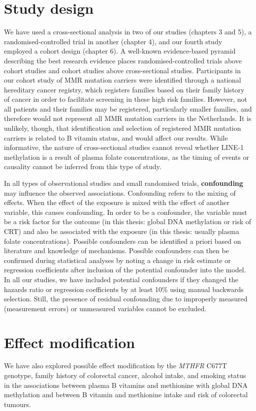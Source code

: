 \section{Study design} %
We have used a cross-sectional analysis in two of our studies (chapters 3 and 5), a randomised-controlled trial in another (chapter 4), and our fourth study employed a cohort design (chapter 6). A well-known evidence-based pyramid describing the best research evidence places randomised-controlled trials above cohort studies and cohort studies above cross-sectional studies. Participants in our cohort study of MMR mutation carriers were identified through a national hereditary cancer registry, which registers families based on their family history of cancer in order to facilitate screening in these high risk families. However, not all patients and their families may be registered, particularly smaller families, and therefore would not represent all MMR mutation carriers in the Netherlands. It is unlikely, though, that identification and selection of registered MMR mutation carriers is related to B vitamin status, and would affect our results. While informative, the nature of cross-sectional studies cannot 
reveal whether LINE-1 methylation is a result of plasma folate concentrations, as the timing of events or causality cannot be inferred from this type of study. 
 
\noindent In all types of observational studies and small randomised trials, \textbf{confounding} may influence the observed associations. Confounding refers to the mixing of effects. When the effect of the exposure is mixed with the effect of another variable, this causes confounding. In order to be a confounder, the variable must be a risk factor for the outcome (in this thesis: global DNA methylation or risk of CRT) and also be associated with the exposure (in this thesis: usually plasma folate concentrations). Possible confounders can be identified a priori based on literature and knowledge of mechanisms. Possible confounders can then be confirmed during statistical analyses by noting a change in risk estimate or regression coefficients after inclusion of the potential confounder into the model. In all our studies, we have included potential confounders if they changed the hazards ratio or regression coefficients by at least 10\% using manual backwards selection. Still, the presence of residual 
confounding due to improperly measured (measurement errors) or unmeasured variables cannot be excluded. 
 
\section{Effect modification} %
We have also explored possible effect modification by the \emph{MTHFR} C677T genotype, family history of colorectal cancer, alcohol intake, and smoking status in the associations between plasma B vitamins and methionine with global DNA methylation and between B vitamin and methionine intake and risk of colorectal tumours. 
 
